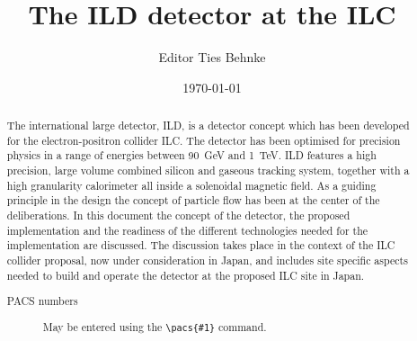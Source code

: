 \documentclass[%
 amsmath,amssymb,
 aps,
]{revtex4-1}
\begin{document}


\title{The ILD detector at the ILC}%

\author{Editor Ties Behnke}




\date{\today}%

\begin{abstract}
The international large detector, ILD, is a detector concept which has been developed for the electron-positron collider ILC. The detector has been optimised for precision physics in a range of energies between 90~GeV and 1~TeV. ILD features a high precision, large volume combined silicon and gaseous tracking system, together with a high granularity calorimeter all inside a solenoidal magnetic field. As a guiding principle in the design the concept of particle flow has been at the center of the deliberations. In this document the concept of the detector, the proposed implementation and the readiness of the different technologies needed for the implementation are discussed. The discussion takes place in the context of the ILC collider proposal, now under consideration in Japan, and includes site specific aspects needed to build and operate the detector at the proposed ILC site in Japan.

\begin{description}
\item[PACS numbers]
May be entered using the \verb+\pacs{#1}+ command.
\end{description}
\end{abstract}
\end{document}
